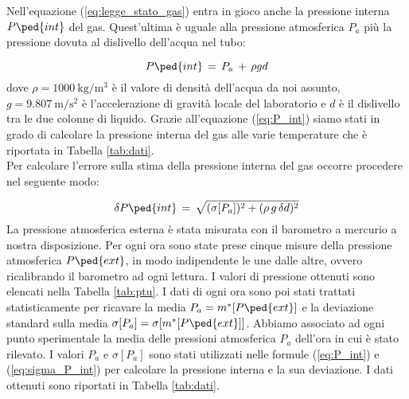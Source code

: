 Nell'equazione (\ref{eq:legge_stato_gas}) entra in gioco anche la pressione interna $P\ped{int}$ del gas. Quest'ultima è uguale alla pressione atmosferica $P_a$ più la pressione dovuta al dislivello dell'acqua nel tubo:

\begin{equation}
	P\ped{int} \,=\, P_a \,+\, \rho  g  d
	\label{eq:P_int}
\end{equation}
%
dove $\rho = \SI{1000}{\kilo\gram\per\cubic\metre}$ è il valore di densità dell'acqua da noi assunto, $g = \SI{9.807}{\meter\per\square\second}$ è l'accelerazione di gravità locale del laboratorio e $d$ è il dislivello tra le due colonne di liquido. Grazie all'equazione (\ref{eq:P_int}) siamo stati in grado di calcolare la pressione interna del gas alle varie temperature che è riportata in Tabella \ref{tab:dati}.\\
Per calcolare l'errore sulla stima della pressione interna del gas occorre procedere nel seguente modo:

\begin{equation}
	\delta P\ped{int} \,=\, \sqrt{(\sigma [P_a])^2 + (\rho\,g\,\delta d)^2}
	\label{eq:sigma_P_int}
\end{equation}
%
La pressione atmosferica esterna è stata misurata con il barometro a mercurio a nostra disposizione. Per ogni ora sono state prese cinque misure della pressione atmosferica $P\ped{ext}$, in modo indipendente le une dalle altre, ovvero ricalibrando il barometro ad ogni lettura. I valori di pressione ottenuti sono elencati nella Tabella \ref{tab:ptu}. I dati di ogni ora sono poi stati trattati statisticamente per ricavare la media $P_a = m^*[P\ped{ext}]$ e la deviazione standard sulla media $\sigma [P_a] = \sigma[m^*[P\ped{ext}]]$. Abbiamo associato ad ogni punto sperimentale la media delle pressioni atmosferica $P_a$ dell'ora in cui è stato rilevato. I valori $P_a$ e $\sigma[P_a]$ sono stati utilizzati nelle formule (\ref{eq:P_int}) e (\ref{eq:sigma_P_int}) per calcolare la pressione
interna e la sua deviazione. I dati ottenuti sono riportati in Tabella \ref{tab:dati}.


